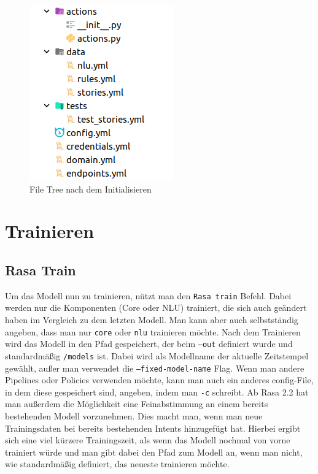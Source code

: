 \begin{figure}[hbt!]
    \centering
    \includegraphics[scale=0.75]{pics/rasa_file_tree}
    \caption{File Tree nach dem Initialisieren}
    \label{fig:file_tree}
\end{figure}


\section{Trainieren}

\subsection{Rasa Train}

Um das Modell nun zu trainieren, nützt man den \texttt{Rasa train} Befehl.
Dabei werden nur die Komponenten (Core oder NLU) trainiert, die sich auch geändert haben im Vergleich zu dem letzten Modell.
Man kann aber auch selbstständig angeben, dass man nur \texttt{core} oder \texttt{nlu} trainieren möchte.
Nach dem Trainieren wird das Modell in den Pfad gespeichert, der beim \texttt{--out} definiert wurde und standardmäßig \texttt{/models} ist.
Dabei wird als Modellname der aktuelle Zeitstempel gewählt, außer man verwendet die \texttt{--fixed-model-name} Flag.
Wenn man andere Pipelines oder Policies verwenden möchte, kann man auch ein anderes config-File, in dem diese gespeichert sind, angeben, indem man \texttt{-c} schreibt.
Ab Rasa 2.2 hat man außerdem die Möglichkeit eine Feinabstimmung an einem bereits bestehenden Modell vorzunehmen.
Dies macht man, wenn man neue Trainingsdaten bei bereits bestehenden Intents hinzugefügt hat.
Hierbei ergibt sich eine viel kürzere Trainingszeit, als wenn das Modell nochmal von vorne trainiert würde und man gibt dabei den Pfad zum Modell an, wenn man nicht, wie standardmäßig definiert, das neueste trainieren möchte.\cite{rasaTrain}

